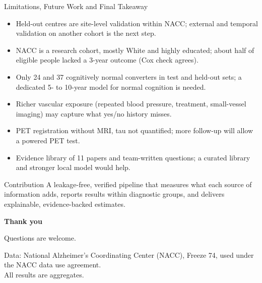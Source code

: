 \documentclass[aspectratio=169,11pt]{beamer}
\begin{document}
\begin{frame}{Limitations, Future Work and Final Takeaway}
\small
\begin{itemize}
\item Held-out centres are site-level validation within NACC; external and temporal validation on another cohort is the next step.
\item NACC is a research cohort, mostly White and highly educated; about half of eligible people lacked a 3-year outcome (Cox check agrees).
\item Only 24 and 37 cognitively normal converters in test and held-out sets; a dedicated 5- to 10-year model for normal cognition is needed.
\item Richer vascular exposure (repeated blood pressure, treatment, small-vessel imaging) may capture what yes/no history misses.
\item PET registration without MRI, tau not quantified; more follow-up will allow a powered PET test.
\item Evidence library of 11 papers and team-written questions; a curated library and stronger local model would help.
\end{itemize}
\begin{block}{Contribution}
A leakage-free, verified pipeline that measures what each source of information adds, reports results within diagnostic groups, and delivers explainable, evidence-backed estimates.
\end{block}
\end{frame}

{
\begin{frame}[noframenumbering]
\centering
\vspace{2em}
{\color{maroon}\bfseries\Huge Thank you\par}
\vspace{1em}
Questions are welcome.\par
\vspace{2em}
\small Data: National Alzheimer's Coordinating Center (NACC), Freeze 74, used under the NACC data use agreement.\\ All results are aggregates.
\end{frame}}
\end{document}
